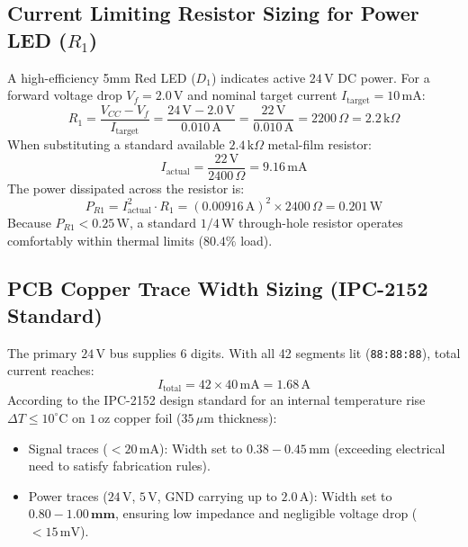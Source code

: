 \documentclass[12pt,a4paper,oneside]{report}
\begin{document}
\subsection{Current Limiting Resistor Sizing for Power LED ($R_1$)}
A high-efficiency 5mm Red LED ($D_1$) indicates active $24\,\text{V}$ DC power. For a forward voltage drop $V_f = 2.0\,\text{V}$ and nominal target current $I_{\text{target}} = 10\,\text{mA}$:
\begin{equation}
R_1 = \frac{V_{CC} - V_f}{I_{\text{target}}} = \frac{24\,\text{V} - 2.0\,\text{V}}{0.010\,\text{A}} = \frac{22\,\text{V}}{0.010\,\text{A}} = 2200\,\Omega = 2.2\,\text{k}\Omega
\end{equation}
When substituting a standard available $2.4\,\text{k}\Omega$ metal-film resistor:
\begin{equation}
I_{\text{actual}} = \frac{22\,\text{V}}{2400\,\Omega} = 9.16\,\text{mA}
\end{equation}
The power dissipated across the resistor is:
\begin{equation}
P_{R1} = I_{\text{actual}}^2 \cdot R_1 = (0.00916\,\text{A})^2 \times 2400\,\Omega = 0.201\,\text{W}
\end{equation}
Because $P_{R1} < 0.25\,\text{W}$, a standard $1/4\,\text{W}$ through-hole resistor operates comfortably within thermal limits ($80.4\%$ load).

\subsection{PCB Copper Trace Width Sizing (IPC-2152 Standard)}
The primary $24\,\text{V}$ bus supplies 6 digits. With all 42 segments lit (\texttt{88:88:88}), total current reaches:
\begin{equation}
I_{\text{total}} = 42 \times 40\,\text{mA} = 1.68\,\text{A}
\end{equation}
According to the IPC-2152 design standard for an internal temperature rise $\Delta T \le 10^\circ\text{C}$ on $1\,\text{oz}$ copper foil ($35\,\mu\text{m}$ thickness):
\begin{itemize}
    \item Signal traces ($< 20\,\text{mA}$): Width set to $0.38 - 0.45\,\text{mm}$ (exceeding electrical need to satisfy fabrication rules).
    \item Power traces ($24\,\text{V}$, $5\,\text{V}$, $\text{GND}$ carrying up to $2.0\,\text{A}$): Width set to $\mathbf{0.80 - 1.00\,\text{mm}}$, ensuring low impedance and negligible voltage drop ($< 15\,\text{mV}$).
\end{itemize}
\end{document}
